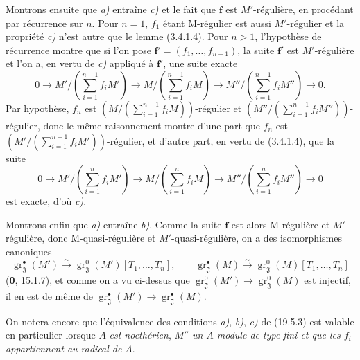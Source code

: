 Montrons ensuite que \emph{a)} entraîne \emph{c)} et le fait que $\mathbf f$ est $M'$-régulière, en procédant par récurrence sur $n$. Pour $n=1$, $f_1$ étant M-régulier est aussi $M'$-régulier et la propriété \emph{c)} n'est autre que le lemme (3.4.1.4). Pour $n>1$, l'hypothèse de récurrence montre que
si l'on pose $\mathbf f'=(f_1,\ldots,f_{n-1})$, la suite $\mathbf f'$ est $M'$-régulière et l'on a, en vertu de \emph{c)} appliqué à $\mathbf f'$, une suite exacte
\[
  0\longrightarrow M'/(\textstyle\sum_{i=1}^{n-1}f_iM')\longrightarrow M/(\textstyle\sum_{i=1}^{n-1}f_iM)\longrightarrow M''/(\textstyle\sum_{i=1}^{n-1}f_iM'')\longrightarrow0.
\]
Par hypothèse, $f_n$ est $(M/(\sum_{i=1}^{n-1}f_iM))$-régulier et $(M''/(\sum_{i=1}^{n-1}f_iM''))$-régulier, donc le même raisonnement montre d'une part que $f_n$ est $(M'/(\sum_{i=1}^{n-1}f_iM'))$-régulier, et d'autre part, en vertu de (3.4.1.4), que la suite
\[
  0\longrightarrow M'/(\textstyle\sum_{i=1}^{n}f_iM')\longrightarrow M/(\textstyle\sum_{i=1}^{n}f_iM)\longrightarrow M''/(\textstyle\sum_{i=1}^{n}f_iM'')\longrightarrow0
\]
est exacte, d'où \emph{c)}.

Montrons enfin que \emph{a)} entraîne \emph{b)}. Comme la suite $\mathbf f$ est alors M-régulière et $M'$-régulière, donc M-quasi-régulière et $M'$-quasi-régulière, on a des isomorphismes canoniques
\[
  \operatorname{gr}_{\mathfrak J}^\bullet(M')\xrightarrow{\sim}\operatorname{gr}_{\mathfrak J}^0(M')[T_1,\ldots,T_n],
  \qquad
  \operatorname{gr}_{\mathfrak J}^\bullet(M)\xrightarrow{\sim}\operatorname{gr}_{\mathfrak J}^0(M)[T_1,\ldots,T_n]
\]
(\textbf{0}, 15.1.7), et comme on a vu ci-dessus que $\operatorname{gr}_{\mathfrak J}^0(M')\to\operatorname{gr}_{\mathfrak J}^0(M)$ est injectif, il en est de même de $\operatorname{gr}_{\mathfrak J}^\bullet(M')\to\operatorname{gr}_{\mathfrak J}^\bullet(M)$.

On notera encore que l'équivalence des conditions \emph{a)}, \emph{b)}, \emph{c)} de (19.5.3) est valable en particulier lorsque $A$ \emph{est noethérien}, $M''$ \emph{un $A$-module de type fini et que les $f_i$ appartiennent au radical de} $A$.

